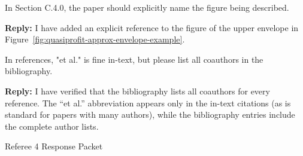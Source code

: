 \documentclass[main.tex]{subfiles}
\begin{document}
\begin{refsection}
\begin{refcommentnoclear}
In Section C.4.0, the paper should explicitly name the figure being described.

\end{refcommentnoclear}

\textbf{Reply:} I have added an explicit reference to the figure of the upper envelope in Figure~\ref{fig:quasiprofit-approx-envelope-example}.

\begin{refcommentnoclear}
In references, "et al." is fine in-text, but please list all coauthors in the bibliography.

\end{refcommentnoclear}

\textbf{Reply:} I have verified that the bibliography lists all coauthors for every reference.
The ``et al.'' abbreviation appears only in the in-text citations (as is standard for papers with many authors), while the bibliography entries include the complete author lists.

\printbibliography
\end{refsection}

\clearpage

{\color{white}\fontsize{1}{1}\selectfont Referee 4 Response Packet}

\newpage
\end{document}
